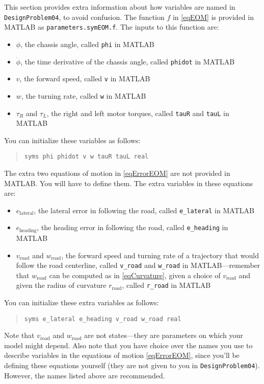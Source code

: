 \documentclass[12pt]{article}
\begin{document}
This section provides extra information about how variables are named in \lstinline|DesignProblem04|, to avoid confusion. The function $f$ in \eqref{eqEOM} is provided in MATLAB as \lstinline|parameters.symEOM.f|. The inputs to this function are:
\begin{itemize}
\item $\phi$, the chassis angle, called \lstinline|phi| in MATLAB
\item $\dot{\phi}$, the time derivative of the chassis angle, called \lstinline|phidot| in MATLAB
\item $v$, the forward speed, called \lstinline|v| in MATLAB
\item $w$, the turning rate, called \lstinline|w| in MATLAB
\item $\tau_{R}$ and $\tau_{L}$, the right and left motor torques, called \lstinline|tauR| and \lstinline|tauL| in MATLAB
\end{itemize}
You can initialize these variables as follows:
\begin{quote}
\begin{lstlisting}
syms phi phidot v w tauR tauL real
\end{lstlisting}
\end{quote}
The extra two equations of motion in \eqref{eqErrorEOM} are not provided in MATLAB. You will have to define them. The extra variables in these equations are:
\begin{itemize}
\item $e_\text{lateral}$, the lateral error in following the road, called \lstinline|e_lateral| in MATLAB
\item $e_\text{heading}$, the heading error in following the road, called \lstinline|e_heading| in MATLAB
\item $v_\text{road}$ and $w_\text{road}$, the forward speed and turning rate of a trajectory that would follow the road centerline, called \lstinline|v_road| and \lstinline|w_road| in MATLAB---remember that $w_\text{road}$ can be computed as in \eqref{eqCurvature}, given a choice of $v_\text{road}$ and given the radius of curvature $r_\text{road}$, called \lstinline|r_road| in MATLAB
\end{itemize}
You can initialize these extra variables as follows:
\begin{quote}
\begin{lstlisting}
syms e_lateral e_heading v_road w_road real
\end{lstlisting}
\end{quote}
Note that $v_\text{road}$ and $w_\text{road}$ are not states---they are parameters on which your model might depend. Also note that you have choice over the names you use to describe variables in the equations of motion \eqref{eqErrorEOM}, since you'll be defining these equations yourself (they are not given to you in \lstinline|DesignProblem04|). However, the names listed above are recommended.
\end{document}
